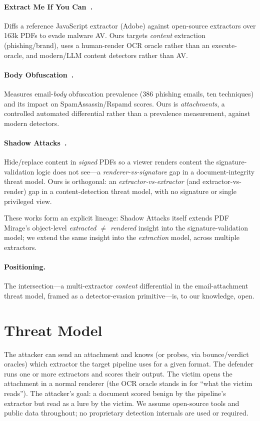 \documentclass[11pt]{article}
\begin{document}
\paragraph{Extract Me If You Can~\cite{extractme}.} Diffs a reference JavaScript
extractor (Adobe) against open-source extractors over 163k PDFs to evade malware
AV. Ours targets \emph{content} extraction (phishing/brand), uses a human-render
OCR oracle rather than an execute-oracle, and modern/LLM content detectors
rather than AV.

\paragraph{Body Obfuscation~\cite{bodyobfuscation}.} Measures email-\emph{body}
obfuscation prevalence (386 phishing emails, ten techniques) and its impact on
SpamAssassin/Rspamd scores. Ours is \emph{attachments}, a controlled automated
differential rather than a prevalence measurement, against modern detectors.

\paragraph{Shadow Attacks~\cite{shadowattacks}.} Hide/replace content in
\emph{signed} PDFs so a viewer renders content the signature-validation logic
does not see---a \emph{renderer-vs-signature} gap in a document-integrity threat
model. Ours is orthogonal: an \emph{extractor-vs-extractor} (and
extractor-vs-render) gap in a content-detection threat model, with no signature
or single privileged view.

These works form an explicit lineage: Shadow Attacks itself extends PDF Mirage's
object-level \emph{extracted $\neq$ rendered} insight into the
signature-validation model; we extend the same insight into the \emph{extraction}
model, across multiple extractors.

\paragraph{Positioning.} The intersection---a multi-extractor \emph{content}
differential in the email-attachment threat model, framed as a detector-evasion
primitive---is, to our knowledge, open.

\section{Threat Model}

The attacker can send an attachment and knows (or probes, via bounce/verdict
oracles) which extractor the target pipeline uses for a given format. The
defender runs one or more extractors and scores their output. The victim opens
the attachment in a normal renderer (the OCR oracle stands in for ``what the
victim reads''). The attacker's goal: a document scored benign by the pipeline's
extractor but read as a lure by the victim. We assume open-source tools and
public data throughout; no proprietary detection internals are used or required.
\end{document}
